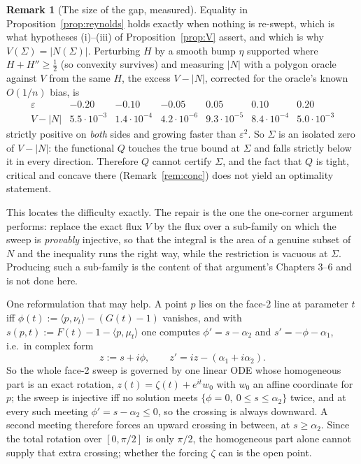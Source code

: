 \documentclass[11pt]{article}
\theoremstyle{definition}
\newtheorem{remark}[theorem]{Remark}
\newcommand{\Sig}{\Sigma}
\begin{document}
\begin{remark}[The size of the gap, measured]\label{rem:gap}
Equality in Proposition~\ref{prop:reynolds} holds exactly when nothing is re-swept, which
is what hypotheses (i)--(iii) of Proposition~\ref{prop:V} assert, and which is why
$V(\Sig)=|N(\Sig)|$. Perturbing $H$ by a smooth bump $\eta$ supported where
$H+H''\ge\tfrac12$ (so convexity survives) and measuring $|N|$ with a polygon oracle
against $V$ from the same $H$, the excess $V-|N|$, corrected for the oracle's known
$O(1/n)$ bias, is
\[
  \begin{array}{r|cccccc}
    \varepsilon & -0.20 & -0.10 & -0.05 & 0.05 & 0.10 & 0.20\\\hline
    V-|N| & 5.5\cdot10^{-3} & 1.4\cdot10^{-4} & 4.2\cdot10^{-6}
          & 9.3\cdot10^{-5} & 8.4\cdot10^{-4} & 5.0\cdot10^{-3}
  \end{array}
\]
strictly positive on \emph{both} sides and growing faster than $\varepsilon^2$. So
$\Sig$ is an isolated zero of $V-|N|$: the functional $Q$ touches the true bound at $\Sig$
and falls strictly below it in every direction. Therefore $Q$ cannot certify $\Sig$, and
the fact that $Q$ is tight, critical and concave there (Remark~\ref{rem:conc}) does not
yield an optimality statement.

This locates the difficulty exactly. The repair is the one the one-corner argument
performs: replace the exact flux $V$ by the flux over a sub-family on which the sweep is
\emph{provably} injective, so that the integral is the area of a genuine subset of $N$ and
the inequality runs the right way, while the restriction is vacuous at $\Sig$. Producing
such a sub-family is the content of that argument's Chapters 3--6 and is not done here.

One reformulation that may help. A point $p$ lies on the face-2 line at parameter $t$ iff
$\phi(t):=\langle p,\nu_t\rangle-(G(t)-1)$ vanishes, and with
$s(p,t):=F(t)-1-\langle p,\mu_t\rangle$ one computes
$\phi'=s-\alpha_2$ and $s'=-\phi-\alpha_1$, i.e.\ in complex form
\[
  z:=s+i\phi,\qquad z'=iz-(\alpha_1+i\alpha_2).
\]
So the whole face-2 sweep is governed by one linear ODE whose homogeneous part is an
exact rotation, $z(t)=\zeta(t)+e^{it}w_0$ with $w_0$ an affine coordinate for $p$; the
sweep is injective iff no solution meets $\{\phi=0,\ 0\le s\le\alpha_2\}$ twice, and at
every such meeting $\phi'=s-\alpha_2\le0$, so the crossing is always downward. A second
meeting therefore forces an upward crossing in between, at $s\ge\alpha_2$. Since the
total rotation over $[0,\pi/2]$ is only $\pi/2$, the homogeneous part alone cannot supply
that extra crossing; whether the forcing $\zeta$ can is the open point.
\end{remark}
\end{document}
